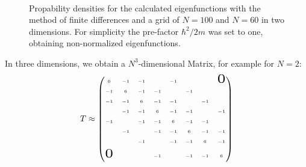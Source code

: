 \documentclass[10pt,a4paper]{article} %
\begin{document}
\begin{figure}[!htb]
	\Huge
	\hspace*{-1.5in}
	\centering
	\subfigure[Color map, $\psi_{12}$, $N=60$.]
		{\resizebox{!}{0.38\textwidth}{}\label{fig:2d_eigenfunction}}
	\\
	\caption{Propability densities for the calculated eigenfunctions with the method of finite differences and a grid of $N=100$ and $N=60$ in two dimensions. For simplicity the pre-factor $\hbar^2 /2m$ was set to one, obtaining non-normalized eigenfunctions.}
	\label{Aufbauskizze}
\end{figure}



In three dimensions, we obtain a $N^3$-dimensional Matrix, for example for $N=2$:
\begin{align*}
T \approx
\tiny
\begin{pmatrix}
 6 & -1 & -1 &  & -1 &  &  & \scalebox{3}{$0$}  \\\\
   -1 & 6 & -1 & -1 &  & -1 &  & \\\\
     -1 & -1 & 6 & -1 & -1 &  & -1 & \\\\
        & -1 & -1 & 6 & -1 & -1 &  & -1\\\\
        -1 &  & -1 & -1 & 6 & -1 & -1 & \\\\
           & -1 &  & -1 & -1 & 6 & -1 & -1\\\\
             &  & -1 &  & -1 & -1 & 6 & -1\\\\
              \scalebox{3}{$0$}  &  &  & -1 &  & -1 & -1 & 6\\\\
              \end{pmatrix}
\end{align*}
\end{document}
